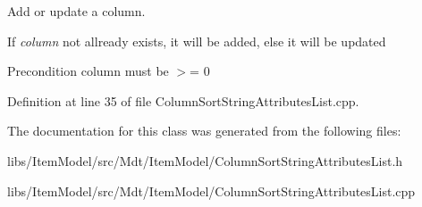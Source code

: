 Add or update a column. 

If {\itshape column} not allready exists, it will be added, else it will be updated

\begin{DoxyPrecond}{Precondition}
column must be $>$= 0 
\end{DoxyPrecond}


Definition at line 35 of file Column\+Sort\+String\+Attributes\+List.\+cpp.



The documentation for this class was generated from the following files\+:\begin{DoxyCompactItemize}
\item 
libs/\+Item\+Model/src/\+Mdt/\+Item\+Model/Column\+Sort\+String\+Attributes\+List.\+h\item 
libs/\+Item\+Model/src/\+Mdt/\+Item\+Model/Column\+Sort\+String\+Attributes\+List.\+cpp\end{DoxyCompactItemize}

